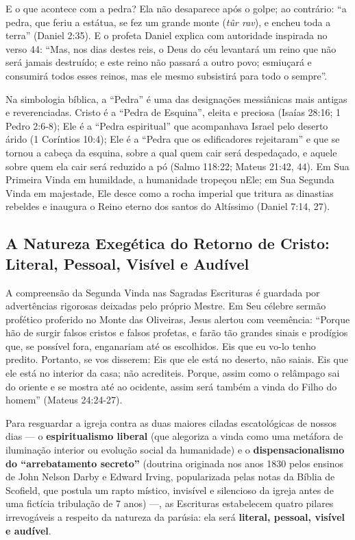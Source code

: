 E o que acontece com a pedra? Ela não desaparece após o golpe; ao contrário:
``a pedra, que feriu a estátua, se fez um grande monte (\textit{tûr rav}), e encheu toda a terra'' (Daniel 2:35).
E o profeta Daniel explica com autoridade inspirada no verso 44:
``Mas, nos dias destes reis, o Deus do céu levantará um reino que não será jamais destruído; e este reino não passará a outro povo; esmiuçará e consumirá todos esses reinos, mas ele mesmo subsistirá para todo o sempre''.

Na simbologia bíblica, a ``Pedra'' é uma das designações messiânicas mais antigas e reverenciadas. Cristo é a ``Pedra de Esquina'', eleita e preciosa (Isaías 28:16; 1 Pedro 2:6-8); Ele é a ``Pedra espiritual'' que acompanhava Israel pelo deserto árido (1 Coríntios 10:4); Ele é a ``Pedra que os edificadores rejeitaram'' e que se tornou a cabeça da esquina, sobre a qual quem cair será despedaçado, e aquele sobre quem ela cair será reduzido a pó (Salmo 118:22; Mateus 21:42, 44). Em Sua Primeira Vinda em humildade, a humanidade tropeçou nEle; em Sua Segunda Vinda em majestade, Ele desce como a rocha imperial que tritura as dinastias rebeldes e inaugura o Reino eterno dos santos do Altíssimo (Daniel 7:14, 27).



\subsection{A Natureza Exegética do Retorno de Cristo: Literal, Pessoal, Visível e Audível}


A compreensão da Segunda Vinda nas Sagradas Escrituras é guardada por advertências rigorosas deixadas pelo próprio Mestre. Em Seu célebre sermão profético proferido no Monte das Oliveiras, Jesus alertou com veemência:
``Porque hão de surgir falsos cristos e falsos profetas, e farão tão grandes sinais e prodígios que, se possível fora, enganariam até os escolhidos. Eis que eu vo-lo tenho predito. Portanto, se vos disserem: Eis que ele está no deserto, não saiais. Eis que ele está no interior da casa; não acrediteis. Porque, assim como o relâmpago sai do oriente e se mostra até ao ocidente, assim será também a vinda do Filho do homem'' (Mateus 24:24-27).

Para resguardar a igreja contra as duas maiores ciladas escatológicas de nossos dias — o \textbf{espiritualismo liberal} (que alegoriza a vinda como uma metáfora de iluminação interior ou evolução social da humanidade) e o \textbf{dispensacionalismo do ``arrebatamento secreto''} (doutrina originada nos anos 1830 pelos ensinos de John Nelson Darby e Edward Irving, popularizada pelas notas da Bíblia de Scofield, que postula um rapto místico, invisível e silencioso da igreja antes de uma fictícia tribulação de 7 anos) —, as Escrituras estabelecem quatro pilares irrevogáveis a respeito da natureza da parúsia: ela será \textbf{literal, pessoal, visível e audível}.

